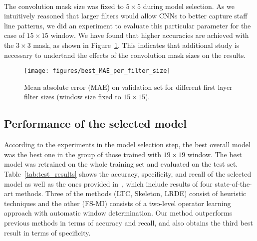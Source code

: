 \documentclass[conference]{IEEEtran}
\begin{document}
\begin{figure*}[!t]
\centering
{}
\hspace{3em}
\\

\hspace{3em}
\caption{Resulting image analysis: (a) region of an image for which
  CNNs obtained worst accuracy, (b) same region in the expected output
  image, and same region in the outputs produced by the best CNN
  models with (c) $9\times9$ and (d) $19\times 19$ windows.}
\label{fig:worst_images}
\end{figure*}


The convolution mask size was fixed to $5\times 5$ during model
selection. As we intuitively reasoned that larger filters would allow
CNNs to better capture staff line patterns, we did an experiment to
evaluate this particular parameter for the case of $15\times 15$
window. We have found that higher accuracies are achieved with the
$3\times 3$ mask, as shown in Figure~\ref{fig:best_filter_size}.
This indicates that additional study is necessary to undertand the
effects of the convolution mask sizes on the results. 
\begin{figure}[htb]
\centering
\texttt{[image: figures/best\_MAE\_per\_filter\_size]}
\caption{Mean absolute error (MAE) on validation set for 
different first layer filter sizes (window size fixed to $15 \times 15$).}
\label{fig:best_filter_size}
\end{figure}



\subsection{Performance of the selected model}

According to the experiments in the model selection step, the best
overall model was the best one in the group of those trained with
$19\times 19$ window. The best model was retrained on the whole
training set and evaluated on the test set.  
Table~\ref{tab:test_results} shows the accuracy, specificity, and
recall of the selected model as well as the ones provided
in~\cite{2017:IgorPR}, which include results of four state-of-the-art
methods. Three of the methods (LTC, Skeleton, LRDE) consist of
heuristic techniques and the other (FS-MI) consists of a two-level
operator learning approach with automatic window determination.
Our method outperforms previous methods in terms of accuracy and
recall, and also obtains the third best result in terms of
specificity.
\end{document}
